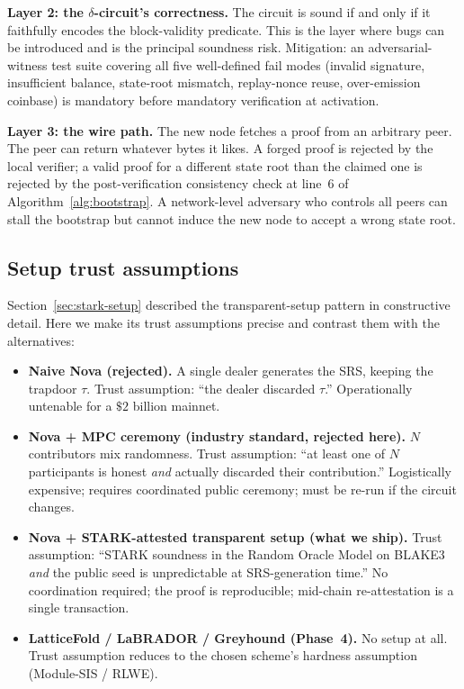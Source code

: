 \documentclass[11pt,a4paper]{article}
\begin{document}
\textbf{Layer 2: the $\delta$-circuit's correctness.} The circuit is
sound if and only if it faithfully encodes the block-validity predicate.
This is the layer where bugs can be introduced and is the principal
soundness risk. Mitigation: an adversarial-witness test suite covering
all five well-defined fail modes (invalid signature, insufficient
balance, state-root mismatch, replay-nonce reuse, over-emission
coinbase) is mandatory before mandatory verification at activation.

\textbf{Layer 3: the wire path.} The new node fetches a proof from
an arbitrary peer. The peer can return whatever bytes it likes. A
forged proof is rejected by the local verifier; a valid proof for a
different state root than the claimed one is rejected by the
post-verification consistency check at line~6 of
Algorithm~\ref{alg:bootstrap}. A network-level adversary who controls
all peers can stall the bootstrap but cannot induce the new node to
accept a wrong state root.

\subsection{Setup trust assumptions}
\label{sec:setup-trust}

Section~\ref{sec:stark-setup} described the transparent-setup pattern in
constructive detail. Here we make its trust assumptions precise and contrast
them with the alternatives:

\begin{itemize}[leftmargin=2em,itemsep=0pt]
\item \textbf{Naive Nova (rejected).} A single dealer generates the SRS,
      keeping the trapdoor $\tau$. Trust assumption: ``the dealer discarded
      $\tau$.'' Operationally untenable for a $\$2$ billion mainnet.
\item \textbf{Nova + MPC ceremony (industry standard, rejected here).}
      $N$ contributors mix randomness. Trust assumption: ``at least one
      of $N$ participants is honest \emph{and} actually discarded their
      contribution.'' Logistically expensive; requires coordinated public
      ceremony; must be re-run if the circuit changes.
\item \textbf{Nova + STARK-attested transparent setup (what we ship).}
      Trust assumption: ``STARK soundness in the Random Oracle Model on
      BLAKE3 \cite{BLAKE3spec,BSBHR2018STARK} \emph{and} the public seed
      is unpredictable at SRS-generation time.'' No coordination required;
      the proof is reproducible; mid-chain re-attestation is a single
      transaction.
\item \textbf{LatticeFold / LaBRADOR / Greyhound (Phase~4).} No setup
      at all. Trust assumption reduces to the chosen scheme's hardness
      assumption (Module-SIS / RLWE).
\end{itemize}
\end{document}

